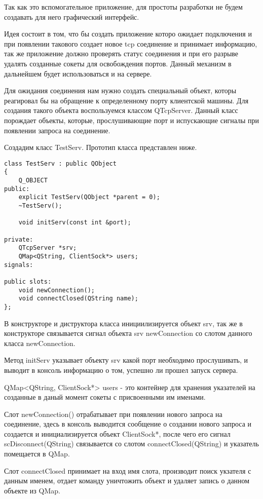 Так как это вспомогательное приложение, для простоты разработки не будем создавать для него графический интерфейс. 

Идея состоит в том, что бы создать приложение которо ожидает подключения и при появлении такового создает новое tcp соединение и принимает информацию, так же приложение должно проверять статус соединения и при его разрыве удалять созданные сокеты для освобождения портов. Данный механизм в дальнейшем будет использоваться и на сервере.

Для ожидания соединения нам нужно создать специальный объект, которы реагировал бы на обращение к определенному порту клиентской машины. Для создания такого объекта воспользуемся классом QTcpServer. Данный класс порождает объекты, которые, прослушивающие порт и испускающие сигналы при появлении запроса на соединение.

Создадим класс TestServ. Прототип класса представлен ниже.

\begin{lstlisting}
class TestServ : public QObject
{
    Q_OBJECT
public:
    explicit TestServ(QObject *parent = 0);
    ~TestServ();

    void initServ(const int &port);

private:
    QTcpServer *srv;
    QMap<QString, ClientSock*> users;
signals:

public slots:
    void newConnection();
    void connectClosed(QString name);
};
\end{lstlisting}
В конструкторе и диструктора класса инициилизируется объект srv, так же в конструкторе связывается сигнал объекта srv newConnection со слотом данного класса newConnection.

Метод initServ указывает объекту srv какой порт необходимо прослушивать, и выводит в консоль информацию о том, успешно ли прошел запуск сервера.

QMap<QString, ClientSock*> users - это контейнер для хранения указателей на созданные в даный момент сокеты с присвоенными им именами.

Слот newConnection() отрабатывает при появлении нового запроса на соединение, здесь в консоль выводится сообщение о создании нового запроса и создается и инициализируется объект ClientSock*, после чего его сигнал scDisconnect(QString) связывается со слотом connectClosed(QString) и указатель помещается в QMap.

Слот connectClosed принимает на вход имя слота, производит поиск укзателя с данным именем, отдает команду уничтожить объект и удаляет запись о данном объекте из QMap.

